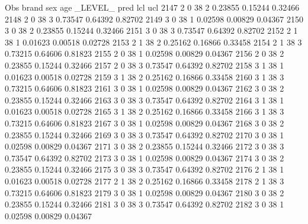 \documentclass{article}
\begin{document}
\begin{Woutput}
 Obs    brand    sex    age    _LEVEL_      pred       lcl        ucl
2147      2       0      38       2       0.23855    0.15244    0.32466
2148      2       0      38       3       0.73547    0.64392    0.82702
2149      3       0      38       1       0.02598    0.00829    0.04367
2150      3       0      38       2       0.23855    0.15244    0.32466
2151      3       0      38       3       0.73547    0.64392    0.82702
2152      2       1      38       1       0.01623    0.00518    0.02728
2153      2       1      38       2       0.25162    0.16866    0.33458
2154      2       1      38       3       0.73215    0.64606    0.81823
2155      2       0      38       1       0.02598    0.00829    0.04367
2156      2       0      38       2       0.23855    0.15244    0.32466
2157      2       0      38       3       0.73547    0.64392    0.82702
2158      3       1      38       1       0.01623    0.00518    0.02728
2159      3       1      38       2       0.25162    0.16866    0.33458
2160      3       1      38       3       0.73215    0.64606    0.81823
2161      3       0      38       1       0.02598    0.00829    0.04367
2162      3       0      38       2       0.23855    0.15244    0.32466
2163      3       0      38       3       0.73547    0.64392    0.82702
2164      3       1      38       1       0.01623    0.00518    0.02728
2165      3       1      38       2       0.25162    0.16866    0.33458
2166      3       1      38       3       0.73215    0.64606    0.81823
2167      3       0      38       1       0.02598    0.00829    0.04367
2168      3       0      38       2       0.23855    0.15244    0.32466
2169      3       0      38       3       0.73547    0.64392    0.82702
2170      3       0      38       1       0.02598    0.00829    0.04367
2171      3       0      38       2       0.23855    0.15244    0.32466
2172      3       0      38       3       0.73547    0.64392    0.82702
2173      3       0      38       1       0.02598    0.00829    0.04367
2174      3       0      38       2       0.23855    0.15244    0.32466
2175      3       0      38       3       0.73547    0.64392    0.82702
2176      2       1      38       1       0.01623    0.00518    0.02728
2177      2       1      38       2       0.25162    0.16866    0.33458
2178      2       1      38       3       0.73215    0.64606    0.81823
2179      3       0      38       1       0.02598    0.00829    0.04367
2180      3       0      38       2       0.23855    0.15244    0.32466
2181      3       0      38       3       0.73547    0.64392    0.82702
2182      3       0      38       1       0.02598    0.00829    0.04367

\end{Woutput}
\end{document}
